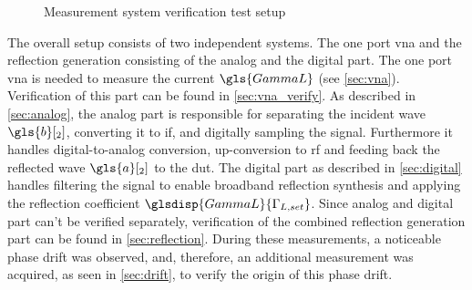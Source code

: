 \documentclass[12pt,a4paper,parskip=full,abstract=true,BCOR=12mm]{scrreprt}
\makeatletter
\newcommand\currentcoordinate{\the\tikz@lastxsaved,\the\tikz@lastysaved}
\makeatother
\begin{document}
\begin{figure}[htb]
{
    }
    \caption{Measurement system verification test setup}
    \label{fig:test_setup}
\end{figure}

The overall setup consists of two independent systems. The one port \gls{vna} and
the reflection generation consisting of the analog and the digital part. The
one port \gls{vna} is needed to measure the current $\gls{GammaL}$ (see
\cref{sec:vna}). Verification of this part can be found in \cref{sec:vna_verify}. As
described in \cref{sec:analog}, the analog part is responsible for separating the
incident wave $\gls{b}[_2]$, converting it to \gls{if}, and digitally sampling the signal.
Furthermore it handles digital-to-analog conversion, up-conversion to \gls{rf} and
feeding back the reflected wave $\gls{a}[_2]$ to the \gls{dut}. The digital part as described
in \cref{sec:digital} handles filtering the signal to enable broadband reflection
synthesis and applying the reflection coefficient $\glsdisp{GammaL}{\Gamma_{L,set}}$. Since analog and
digital part can't be verified separately, verification of the combined reflection
generation part can be found in \cref{sec:reflection}. During these measurements,
a noticeable phase drift was observed, and, therefore, an additional measurement was
acquired, as seen in \cref{sec:drift}, to verify the origin
of this phase drift.
\end{document}
